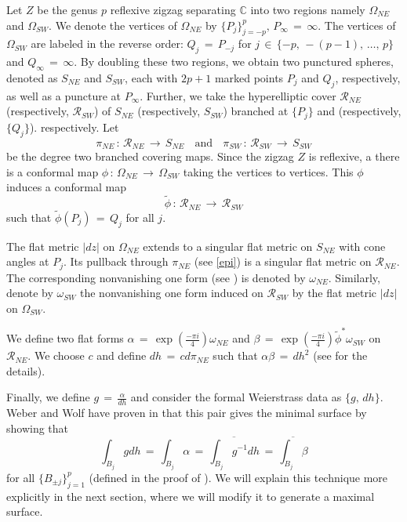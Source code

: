 \documentclass[12pt,epsfig,tikz,multi]{amsart}
\numberwithin{equation}{section}
\def \C {{\mathbb {C}}}
\begin{document}
Let $Z$ be the genus $p$ reflexive zigzag separating $\C$ into two regions namely $\Omega_{NE}$ and $\Omega_{SW}$. 
We denote the vertices of $\Omega_{NE}$ by $\lbrace P_{j}\rbrace_{j=-p}^{p},\,P_{\infty}\,=\,\infty$. The vertices 
of $\Omega_{SW}$ are labeled in the reverse order: $Q_j\,=\,P_{-j}$ for $j\,\in\,\lbrace 
-p,\,-(p-1),\,\ldots,\,p\rbrace$ and $Q_{\infty}\,=\,\infty$. By doubling these two regions, we obtain two punctured spheres, denoted as $S_{NE}$ and $S_{SW}$, each with $2p+1$ marked points ${P_j}$ and ${Q_j}$, respectively, as well as a puncture at $P_{\infty}$\color{black}.  
Further, we take the hyperelliptic cover $\mathcal{R}_{NE}$ (respectively, $\mathcal{R}_{SW}$)
of $S_{NE}$ (respectively, $S_{SW}$) branched at $\{P_j\}$ and (respectively, $\{Q_j\}$).
respectively. Let
\begin{equation}\label{epi}
\pi_{NE}\,:\, \mathcal{R}_{NE}\, \longrightarrow\, S_{NE}\ \ \,\text{ and }\ \ \,
\pi_{SW}\,:\, \mathcal{R}_{SW}\, \longrightarrow\, S_{SW}
\end{equation}
be the degree two branched covering maps.
Since the zigzag $Z$ is reflexive, a there is a conformal map 
$\phi\,:\,\Omega_{NE}\,\longrightarrow\,\Omega_{SW}$ taking the vertices to vertices. This $\phi$ induces a 
conformal map 
$$\widetilde{\phi}\,:\,\mathcal{R}_{NE}\,\longrightarrow\,\mathcal{R}_{SW}$$ such that
$\widetilde{\phi}(P_j)\,=\,Q_j$ for all $j$.

The flat metric $|dz|$ on $\Omega_{NE}$ extends to a singular flat metric on $S_{NE}$ with cone angles at 
$P_j$. Its pullback through $\pi_{NE}$ (see \eqref{epi}) is a singular flat metric on $\mathcal{R}_{NE}$. 
The corresponding nonvanishing one form (see \cite{weber1998minimal}) is denoted by
$\omega_{NE}$. Similarly, denote by $\omega_{SW}$ the nonvanishing one form induced on $\mathcal{R}_{SW}$
by the flat metric $|dz|$ on $\Omega_{SW}$.

We define two flat forms $\alpha\,=\,\exp({\frac{-\pi i }{4}})\omega_{NE}$ and $\beta\,=\,
\exp({\frac{-\pi i }{4}})\widetilde{\phi}^*\omega_{SW}$ on $\mathcal{R}_{NE}$.
We choose $c$ and define $dh\,=\,c d\pi_{NE}$ such that $\alpha\beta\,=\,dh^2$ (see \cite{weber1998minimal}
for the details).

Finally, we define $g\,=\,\frac{\alpha}{dh}$ and
consider the formal Weierstrass data as $\lbrace g,\,dh\rbrace$. Weber and Wolf have proven in
\cite{weber1998minimal} that this pair gives the minimal surface by showing that
$$\int_{B_j} gdh\,=\,\int_{B_j}\alpha\,=\,\overline{\int_{B_j}g^{-1}dh}\,=\,\overline{\int_{B_j}\beta}$$
for all $\lbrace B_{\pm j}\rbrace_{j=1}^{p}$ (defined in the proof of \cite[Theorem 3.3]{weber1998minimal}). We
will explain this technique more explicitly in the next section, where we will modify it to generate
a maximal surface.
\end{document}
